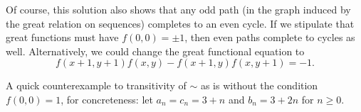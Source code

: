 \begin{remark*}
Of course, this solution also shows that any odd path
(in the graph induced by the great relation on sequences)
completes to an even cycle.
If we stipulate that great functions must have $f(0, 0) = \pm 1$,
then even paths complete to cycles as well.
Alternatively, we could change the great functional equation to
\[f(x + 1, y + 1) f(x, y) - f(x + 1, y) f(x, y + 1) = -1.\]

A quick counterexample to transitivity of $\sim$ as is
without the condition $f(0,0)=1$, for concreteness:
let $a_n = c_n = 3+n$ and $b_n = 3+2n$ for $n \ge 0$.
\end{remark*}

